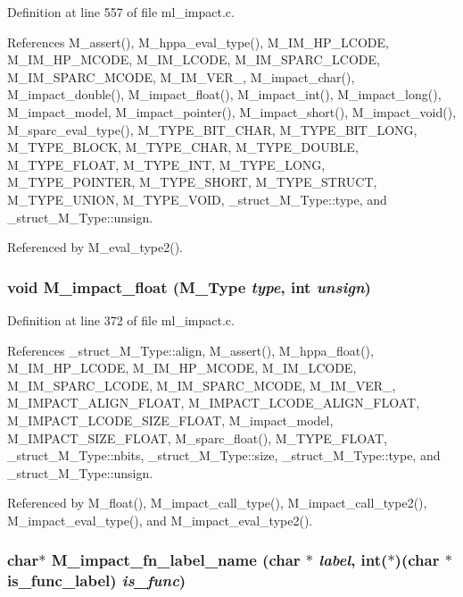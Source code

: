 Definition at line 557 of file ml\_\-impact.c.

References M\_\-assert(), M\_\-hppa\_\-eval\_\-type(), M\_\-IM\_\-HP\_\-LCODE, M\_\-IM\_\-HP\_\-MCODE, M\_\-IM\_\-LCODE, M\_\-IM\_\-SPARC\_\-LCODE, M\_\-IM\_\-SPARC\_\-MCODE, M\_\-IM\_\-VER\_, M\_\-impact\_\-char(), M\_\-impact\_\-double(), M\_\-impact\_\-float(), M\_\-impact\_\-int(), M\_\-impact\_\-long(), M\_\-impact\_\-model, M\_\-impact\_\-pointer(), M\_\-impact\_\-short(), M\_\-impact\_\-void(), M\_\-sparc\_\-eval\_\-type(), M\_\-TYPE\_\-BIT\_\-CHAR, M\_\-TYPE\_\-BIT\_\-LONG, M\_\-TYPE\_\-BLOCK, M\_\-TYPE\_\-CHAR, M\_\-TYPE\_\-DOUBLE, M\_\-TYPE\_\-FLOAT, M\_\-TYPE\_\-INT, M\_\-TYPE\_\-LONG, M\_\-TYPE\_\-POINTER, M\_\-TYPE\_\-SHORT, M\_\-TYPE\_\-STRUCT, M\_\-TYPE\_\-UNION, M\_\-TYPE\_\-VOID, \_\-struct\_\-M\_\-Type::type, and \_\-struct\_\-M\_\-Type::unsign.

Referenced by M\_\-eval\_\-type2().
\subsubsection{\setlength{\rightskip}{0pt plus 5cm}void M\_\-impact\_\-float (\bf{M\_\-Type} {\em type}, int {\em unsign})}\label{ml__impact_8c_d94006697d99ac56f4256f80d5af0a73}




Definition at line 372 of file ml\_\-impact.c.

References \_\-struct\_\-M\_\-Type::align, M\_\-assert(), M\_\-hppa\_\-float(), M\_\-IM\_\-HP\_\-LCODE, M\_\-IM\_\-HP\_\-MCODE, M\_\-IM\_\-LCODE, M\_\-IM\_\-SPARC\_\-LCODE, M\_\-IM\_\-SPARC\_\-MCODE, M\_\-IM\_\-VER\_, M\_\-IMPACT\_\-ALIGN\_\-FLOAT, M\_\-IMPACT\_\-LCODE\_\-ALIGN\_\-FLOAT, M\_\-IMPACT\_\-LCODE\_\-SIZE\_\-FLOAT, M\_\-impact\_\-model, M\_\-IMPACT\_\-SIZE\_\-FLOAT, M\_\-sparc\_\-float(), M\_\-TYPE\_\-FLOAT, \_\-struct\_\-M\_\-Type::nbits, \_\-struct\_\-M\_\-Type::size, \_\-struct\_\-M\_\-Type::type, and \_\-struct\_\-M\_\-Type::unsign.

Referenced by M\_\-float(), M\_\-impact\_\-call\_\-type(), M\_\-impact\_\-call\_\-type2(), M\_\-impact\_\-eval\_\-type(), and M\_\-impact\_\-eval\_\-type2().
\subsubsection{\setlength{\rightskip}{0pt plus 5cm}char$\ast$ M\_\-impact\_\-fn\_\-label\_\-name (char $\ast$ {\em label}, int($\ast$)(char $\ast$is\_\-func\_\-label) {\em is\_\-func})}\label{ml__impact_8c_f316ca56f8d396b8a66ededaf48cc47c}




